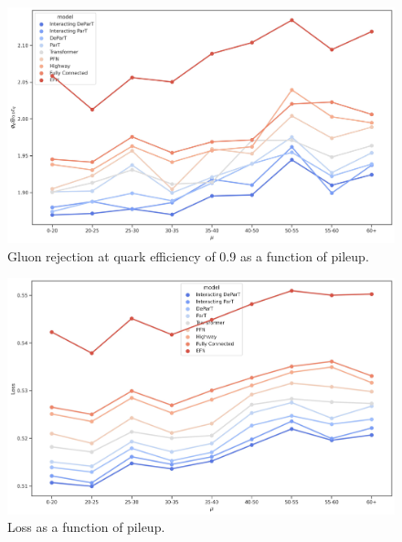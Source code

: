 \begin{figure}[htb]
    \centering
    \includegraphics[width=1\linewidth]{src/plots/results/mu_dep/gluon_rej_at_quark_eff_0.9.jpg}
    \caption{Gluon rejection at quark efficiency of 0.9 as a function of pileup.}
    \label{fig:gluon_rej_at_quark_eff_0.9_pileup}
\end{figure}

\begin{figure}[htb]
    \centering
    \includegraphics[width=1\linewidth]{src/plots/results/mu_dep/loss.jpg}
    \caption{Loss as a function of pileup.}
    \label{fig:loss_pileup}
\end{figure}


